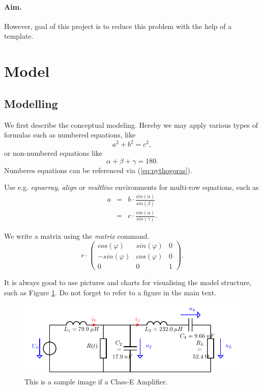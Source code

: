 \documentclass[a4paper,11pt]{scrartcl}
\newcommand{\p}{\varphi}
\newcommand{\al}{\alpha}
\newcommand{\be}{\beta}
\newcommand{\g}{\gamma}
\begin{document}
\paragraph{Aim.} However, goal of this project is to reduce this problem with the help of a template.

\section{Model}
\subsection{Modelling}
\label{sec:modelling}
We first describe the conceptual modeling. Hereby we may apply various types of formulas such as numbered equations, like
\begin{equation}
\label{eq:pythogoras}
 a^2 + b^2 = c^2,
\end{equation}
or non-numbered equations like
\begin{equation*}
 \al + \be + \g = 180.
\end{equation*}
Numberes equations can be referenced via (\ref{eq:pythogoras}).

Use e.g. \textit{eqnarray}, \textit{align} or \textit{multline} environments for multi-row equations, such as
\begin{eqnarray}
  a &=& b\cdot \frac{sin(\al)}{sin(\be)} \\
    &=& c\cdot \frac{sin(\al)}{sin(\g)}.
\end{eqnarray}

We write a matrix using the \textit{matrix} command.
\[ r\cdot
\begin{pmatrix}
 cos(\p) & sin(\p) & 0 \\
 -sin(\p) & cos(\p) & 0 \\
 0 & 0 & 1
\end{pmatrix}.
\]

It is always good to use pictures and charts for visualising the model structure, such as Figure \ref{fig:figure}. Do not forget to refer to a figure in the main text.
\begin{figure}[!ht]
 \centering
 \includegraphics[width=\textwidth]{./images/ClassEAmplifier.pdf}
 \caption{This is a sample image if a Class-E Amplifier.}
 \label{fig:figure}
\end{figure}
\end{document}
